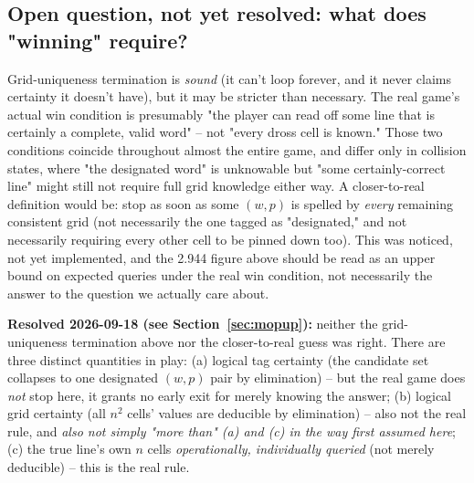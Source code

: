 \documentclass[11pt]{article}
\begin{document}
\subsection{Open question, not yet resolved: what does "winning" require?}

Grid-uniqueness termination is \emph{sound} (it can't loop forever, and it
never claims certainty it doesn't have), but it may be stricter than
necessary. The real game's actual win condition is presumably "the player
can read off some line that is certainly a complete, valid word" -- not
"every dross cell is known." Those two conditions coincide throughout
almost the entire game, and differ only in collision states, where "the
designated word" is unknowable but "some certainly-correct line" might
still not require full grid knowledge either way. A closer-to-real
definition would be: stop as soon as some $(w,p)$ is spelled by
\emph{every} remaining consistent grid (not necessarily the one tagged as
"designated," and not necessarily requiring every other cell to be
pinned down too). This was noticed, not yet implemented, and the 2.944
figure above should be read as an upper bound on expected queries under
the real win condition, not necessarily the answer to the question we
actually care about.

\textbf{Resolved 2026-09-18 (see Section~\ref{sec:mopup}):} neither the
grid-uniqueness termination above nor the closer-to-real guess was right.
There are three distinct quantities in play: (a) logical tag certainty
(the candidate set collapses to one designated $(w,p)$ pair by
elimination) -- but the real game does \emph{not} stop here, it grants no
early exit for merely knowing the answer; (b) logical grid certainty (all
$n^2$ cells' values are deducible by elimination) -- also not the real
rule, and \emph{also not simply "more than" (a) and (c) in the way first
assumed here}; (c) the true line's own $n$ cells \emph{operationally,
individually queried} (not merely deducible) -- this is the real rule.
\end{document}
